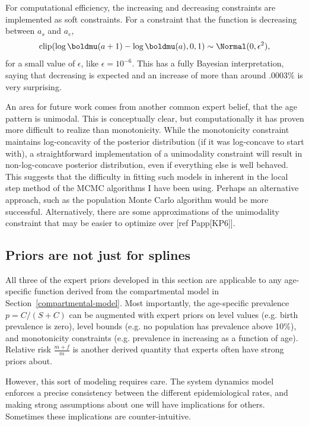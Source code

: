 For computational efficiency, the increasing and decreasing
constraints are implemented as soft constraints.  For a constraint
that the function is decreasing between $a_s$ and $a_e$,
\[
\operatorname{clip}(\log \boldmu(a+1) - \log \boldmu(a), 0, 1) \sim \Normal(0, \epsilon^2),
\]
for a small value of $\epsilon$, like $\epsilon = 10^{-6}$.  This has
a fully Bayesian interpretation, saying that decreasing is expected
and an increase of more than around .0003\% is very surprising.


An area for future work comes from another common expert belief, that
the age pattern is unimodal.  This is conceptually clear, but
computationally it has proven more difficult to realize than
monotonicity.  While the monotonicity constraint maintains
log-concavity of the posterior distribution (if it was log-concave to
start with), a straightforward implementation of a unimodality
constraint will result in non-log-concave posterior distribution, even
if everything else is well behaved.  This suggests that the difficulty
in fitting such models in inherent in the local step method of the
MCMC algorithms I have been using.  Perhaps an alternative approach,
such as the population Monte Carlo algorithm would be more successful.
Alternatively, there are some approximations of the unimodality
constraint that may be easier to optimize over [ref Papp[KP6]].

\subsection{Priors are not just for splines}
All three of the expert priors developed in this section are
applicable to any age-specific function derived from the compartmental
model in Section~\ref{compartmental-model}. Most importantly, the
age-specific prevalence $p = C/(S+C)$ can be augmented with expert
priors on level values (e.g. birth prevalence is zero), level bounds
(e.g. no population has prevalence above 10\%), and monotonicity
constraints (e.g. prevalence in increasing as a function of
age). Relative risk $\frac{m+f}{m}$ is another derived quantity that
experts often have strong priors about.

However, this sort of modeling requires care. The system dynamics
model enforces a precise consistency between the different
epidemiological rates, and making strong assumptions about one will
have implications for others.  Sometimes these implications are
counter-intuitive.

